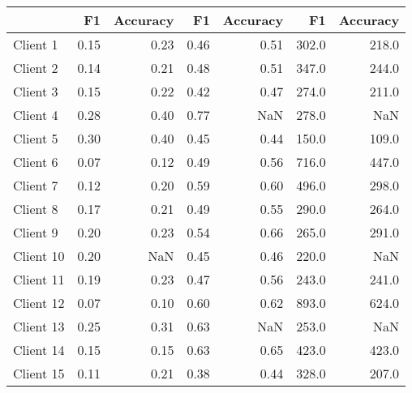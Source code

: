 \begin{tabular}{lrrrrrr}
\toprule
{} &    F1 &  Accuracy &    F1 &  Accuracy &     F1 &  Accuracy \\
\midrule
Client 1  &  0.15 &      0.23 &  0.46 &      0.51 &  302.0 &     218.0 \\
Client 2  &  0.14 &      0.21 &  0.48 &      0.51 &  347.0 &     244.0 \\
Client 3  &  0.15 &      0.22 &  0.42 &      0.47 &  274.0 &     211.0 \\
Client 4  &  0.28 &      0.40 &  0.77 &       NaN &  278.0 &       NaN \\
Client 5  &  0.30 &      0.40 &  0.45 &      0.44 &  150.0 &     109.0 \\
Client 6  &  0.07 &      0.12 &  0.49 &      0.56 &  716.0 &     447.0 \\
Client 7  &  0.12 &      0.20 &  0.59 &      0.60 &  496.0 &     298.0 \\
Client 8  &  0.17 &      0.21 &  0.49 &      0.55 &  290.0 &     264.0 \\
Client 9  &  0.20 &      0.23 &  0.54 &      0.66 &  265.0 &     291.0 \\
Client 10 &  0.20 &       NaN &  0.45 &      0.46 &  220.0 &       NaN \\
Client 11 &  0.19 &      0.23 &  0.47 &      0.56 &  243.0 &     241.0 \\
Client 12 &  0.07 &      0.10 &  0.60 &      0.62 &  893.0 &     624.0 \\
Client 13 &  0.25 &      0.31 &  0.63 &       NaN &  253.0 &       NaN \\
Client 14 &  0.15 &      0.15 &  0.63 &      0.65 &  423.0 &     423.0 \\
Client 15 &  0.11 &      0.21 &  0.38 &      0.44 &  328.0 &     207.0 \\
\bottomrule
\end{tabular}
